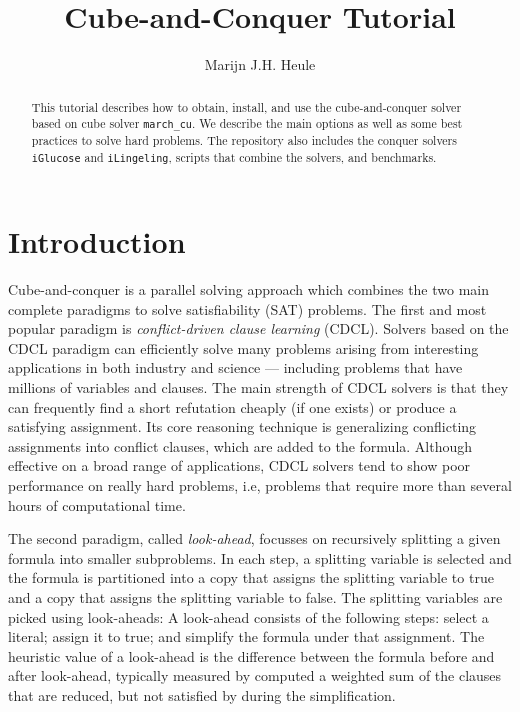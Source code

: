 \documentclass{llncs}
\title{Cube-and-Conquer Tutorial}
\author{Marijn J.H. Heule}
\institute{The University of Texas at Austin}
\begin{document}
\maketitle

\begin{abstract}
This tutorial describes how to obtain, install, and use the cube-and-conquer solver
based on cube solver {\tt march\_cu}. We describe the main options as well as 
some best practices to solve hard problems. The repository also includes the conquer solvers
{\tt iGlucose} and {\tt iLingeling}, scripts that combine the solvers, and benchmarks.
\end{abstract}


\section{Introduction}

Cube-and-conquer is a parallel solving approach which combines the two main complete paradigms to solve 
satisfiability (SAT) problems. The first and most popular paradigm is 
{\em conflict-driven clause learning} (CDCL). Solvers based on the CDCL paradigm can efficiently solve many
problems arising from interesting applications in both industry and science --- including problems that
have millions of variables and clauses. The main strength of CDCL solvers is that they can frequently
find a short refutation cheaply (if one exists) or produce a satisfying assignment. Its core reasoning technique
is generalizing conflicting assignments into conflict clauses, which are added to the formula.
Although effective on a broad range of applications, CDCL solvers tend to show poor performance on
really hard problems, i.e, problems that require more than several hours of computational time. 

The second paradigm, called {\em look-ahead}, focusses on recursively splitting a given formula into 
smaller subproblems. In each step, a splitting variable is selected and the formula is partitioned into
a copy that assigns the splitting variable to true and a copy that assigns the splitting variable to false.
The splitting variables are picked using look-aheads:
A look-ahead consists of the following steps: select a literal; assign it to true; and simplify the
formula under that assignment. The heuristic value of a look-ahead is the difference between the formula before 
and after look-ahead, typically measured by computed a weighted sum of the clauses that are reduced, but not satisfied by
during the simplification.
\end{document}
